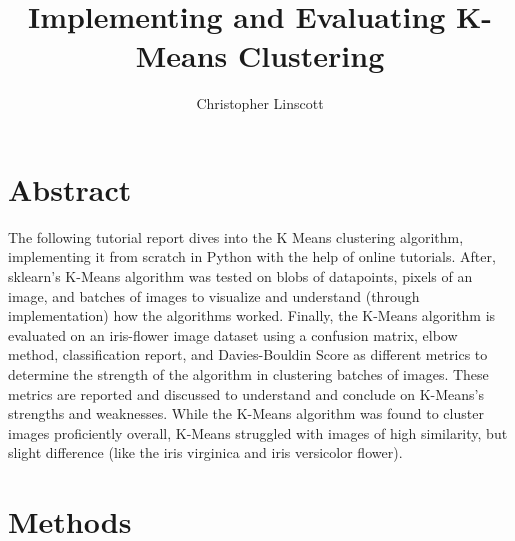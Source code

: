 \documentclass[10pt,twocolumn]{article}
\title{Implementing and Evaluating K-Means Clustering}
\author{Christopher Linscott}
\affiliation{Occidental College}
\begin{document}
\maketitle


\section {Abstract}


The following tutorial report dives into the K Means clustering algorithm, implementing it from scratch in Python with the help of online tutorials. After, sklearn's K-Means algorithm was tested on blobs of datapoints, pixels of an image, and batches of images to visualize and understand (through implementation) how the algorithms worked. Finally, the K-Means algorithm is evaluated on an iris-flower image dataset using a confusion matrix, elbow method, classification report, and Davies-Bouldin Score as different metrics to determine the strength of the algorithm in clustering batches of images. These metrics are reported and discussed to understand and conclude on K-Means's strengths and weaknesses. While the K-Means algorithm was found to cluster images proficiently overall, K-Means struggled with images of high similarity, but slight difference (like the iris virginica and iris versicolor flower).

\section {Methods}
\end{document}
